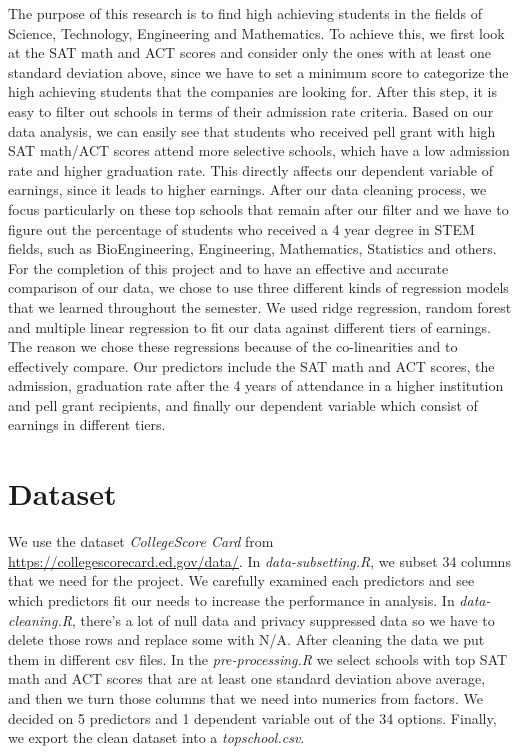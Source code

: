\documentclass{article}
\begin{document}
The purpose of this research is to find high achieving students in the fields of Science, Technology, Engineering and Mathematics. To achieve this, we first look at the SAT math and ACT scores and consider only the ones with at least one standard deviation above, since we have to set a minimum score to categorize the high achieving students that the companies are looking for. After this step, it is easy to filter out schools in terms of their admission rate criteria. Based on our data analysis, we can easily see that students who received pell grant with high SAT math/ACT scores attend more selective schools, which have a low admission rate and higher graduation rate. This directly affects our dependent variable of earnings, since it leads to higher earnings. 
After our data cleaning process, we focus particularly on these top schools that remain after our filter and we have to figure out the percentage of students who received a 4 year degree in STEM fields, such as BioEngineering, Engineering, Mathematics, Statistics and others. For the completion of this project and to have an effective and accurate comparison of our data, we chose to use three different kinds of regression models that we learned throughout the semester. We used ridge regression, random forest and multiple linear regression to fit our data against different tiers of earnings. The reason we chose these regressions because of the co-linearities and to effectively compare. Our predictors include the SAT math and ACT scores, the admission, graduation rate after the 4 years of attendance in a higher institution and pell grant recipients, and finally our dependent variable which consist of earnings in different tiers. 


\section{Dataset}

We use the dataset \emph{CollegeScore Card} from \url{https://collegescorecard.ed.gov/data/}. In \emph{data-subsetting.R}, we subset 34 columns that we need for the project. We carefully examined each predictors and see which predictors fit our needs to increase the performance in analysis.  In \emph{data-cleaning.R},  there's a lot of null data and privacy suppressed data so we have to delete those rows and replace some with N/A. After cleaning the data we put them in different csv files. In the \emph{pre-processing.R} we select schools with top SAT math and ACT scores that are at least one standard deviation above average, and then we turn those columns that we need into numerics from factors. We decided on 5 predictors and 1 dependent variable out of the 34 options. Finally, we export the clean dataset into a \emph{topschool.csv}.
\end{document}
